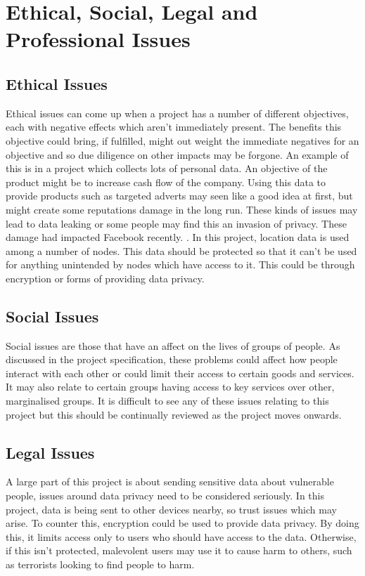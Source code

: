 \documentclass{report}
\begin{document}
\chapter{Ethical, Social, Legal and Professional Issues}

\section{Ethical Issues}

Ethical issues can come up when a project has a number of different objectives, each with negative effects which aren't immediately present. The benefits this objective could bring, if fulfilled, might out weight the immediate negatives for an objective and so due diligence on other impacts may be forgone. An example of this is in a project which collects lots of personal data. An objective of the product might be to increase cash flow of the company. Using this data to provide products such as targeted adverts may seen like a good idea at first, but might create some reputations damage in the long run. These kinds of issues may lead to data leaking or some people may find this an invasion of privacy. These damage had impacted Facebook recently. \cite{fbbreak}. In this project, location data is used among a number of nodes. This data should be protected so that it can't be used for anything unintended by nodes which have access to it. This could be through encryption or forms of providing data privacy. 

\section{Social Issues}

Social issues are those that have an affect on the lives of groups of people. As discussed in the project specification, these problems could affect how people interact with each other or could limit their access to certain goods and services. It may also relate to certain groups having access to key services over other, marginalised groups. It is difficult to see any of these issues relating to this project but this should be continually reviewed as the project moves onwards. 

\section{Legal Issues}

A large part of this project is about sending sensitive data about vulnerable people, issues around data privacy need to be considered seriously. In this project, data is being sent to other devices nearby, so trust issues which may arise. To counter this, encryption could be used to provide data privacy. By doing this, it limits access only to users who should have access to the data. Otherwise, if this isn't protected, malevolent users may use it to cause harm to others, such as terrorists looking to find people to harm. 
\end{document}
